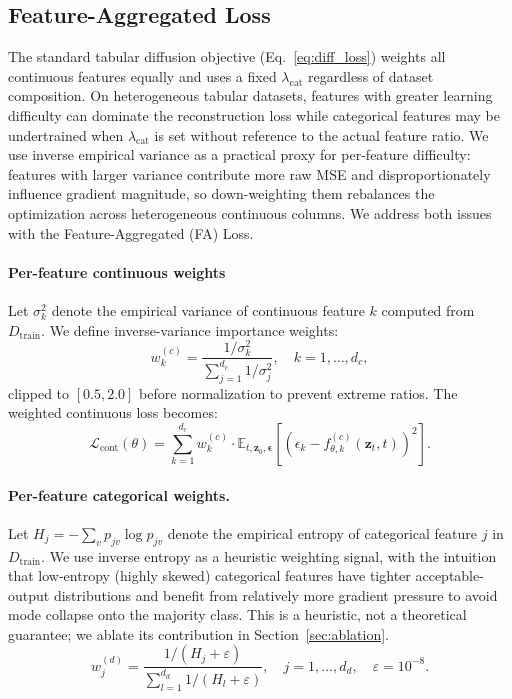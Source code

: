 \documentclass[preprint,12pt]{elsarticle}
\begin{document}
\subsection{Feature-Aggregated Loss}
\label{sec:method_faloss}

The standard tabular diffusion objective (Eq.~\ref{eq:diff_loss}) weights all continuous features equally and uses a fixed $\lambda_{\text{cat}}$ regardless of dataset composition. On heterogeneous tabular datasets, features with greater learning difficulty can dominate the reconstruction loss while categorical features may be undertrained when $\lambda_{\text{cat}}$ is set without reference to the actual feature ratio. We use inverse empirical variance as a practical proxy for per-feature difficulty: features with larger variance contribute more raw MSE and disproportionately influence gradient magnitude, so down-weighting them rebalances the optimization across heterogeneous continuous columns. We address both issues with the Feature-Aggregated (FA) Loss.

\paragraph{Per-feature continuous weights}
Let $\sigma_k^2$ denote the empirical variance of continuous feature $k$ computed from $D_{\text{train}}$. We define inverse-variance importance weights:
\begin{equation}
w_k^{(c)} = \frac{1/\sigma_k^2}{\sum_{j=1}^{d_c} 1/\sigma_j^2}, \quad k = 1, \dots, d_c,
\label{eq:fa_cont_weights}
\end{equation}
clipped to $[0.5, 2.0]$ before normalization to prevent extreme ratios. The weighted continuous loss becomes:
\begin{equation}
\mathcal{L}_{\text{cont}}(\theta) = \sum_{k=1}^{d_c} w_k^{(c)} \cdot \mathbb{E}_{t, \mathbf{z}_0, \boldsymbol{\epsilon}}\!\left[\left(\epsilon_k - f_{\theta,k}^{(c)}(\mathbf{z}_t, t)\right)^2\right].
\label{eq:fa_cont_loss}
\end{equation}

\paragraph{Per-feature categorical weights.}
Let $H_j = -\sum_v p_{jv} \log p_{jv}$ denote the empirical entropy of categorical feature $j$ in $D_{\text{train}}$. We use inverse entropy as a heuristic weighting signal, with the intuition that low-entropy (highly skewed) categorical features have tighter acceptable-output distributions and benefit from relatively more gradient pressure to avoid mode collapse onto the majority class. This is a heuristic, not a theoretical guarantee; we ablate its contribution in Section~\ref{sec:ablation}.
\begin{equation}
w_j^{(d)} = \frac{1/(H_j + \varepsilon)}{\sum_{l=1}^{d_d} 1/(H_l + \varepsilon)}, \quad j = 1, \dots, d_d, \quad \varepsilon = 10^{-8}.
\label{eq:fa_cat_weights}
\end{equation}
\end{document}
